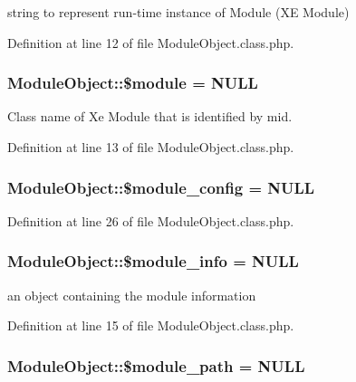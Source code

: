 string to represent run-\/time instance of Module (X\-E Module) 



Definition at line 12 of file Module\-Object.\-class.\-php.

\hypertarget{classModuleObject_a2809af79b38269089ba46bc922061ae8}{
\subsubsection[{\$module}]{\setlength{\rightskip}{0pt plus 5cm}Module\-Object\-::\$module = N\-U\-L\-L}}\label{classModuleObject_a2809af79b38269089ba46bc922061ae8}


Class name of Xe Module that is identified by mid. 



Definition at line 13 of file Module\-Object.\-class.\-php.

\hypertarget{classModuleObject_aed2cac16f365c2b463772e3eeb0c1402}{
\subsubsection[{\$module\-\_\-config}]{\setlength{\rightskip}{0pt plus 5cm}Module\-Object\-::\$module\-\_\-config = N\-U\-L\-L}}\label{classModuleObject_aed2cac16f365c2b463772e3eeb0c1402}


Definition at line 26 of file Module\-Object.\-class.\-php.

\hypertarget{classModuleObject_ac1c9807e77270f2e2abe4f79e1cd2987}{
\subsubsection[{\$module\-\_\-info}]{\setlength{\rightskip}{0pt plus 5cm}Module\-Object\-::\$module\-\_\-info = N\-U\-L\-L}}\label{classModuleObject_ac1c9807e77270f2e2abe4f79e1cd2987}


an object containing the module information 



Definition at line 15 of file Module\-Object.\-class.\-php.

\hypertarget{classModuleObject_aba24677d5cf457dc33d9af3d8a3b3a14}{
\subsubsection[{\$module\-\_\-path}]{\setlength{\rightskip}{0pt plus 5cm}Module\-Object\-::\$module\-\_\-path = N\-U\-L\-L}}\label{classModuleObject_aba24677d5cf457dc33d9af3d8a3b3a14}


